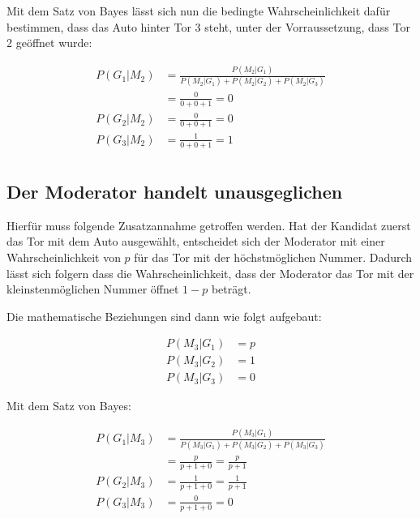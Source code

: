 Mit dem Satz von Bayes lässt sich nun die bedingte Wahrscheinlichkeit dafür bestimmen, dass das Auto hinter Tor 3 steht, unter der Vorraussetzung, dass Tor 2 geöffnet wurde:

\begin{equation}
    \begin{split}
        P(G_1 | M_2) & = \frac{P(M_2 | G_1)}{P(M_2 | G_1) +
            P(M_2 | G_2) + P(M_2 | G_3)} \\
        & = \frac{0}{0+0+1} = 0 \\
        P(G_2 | M_2) & =  \frac{0}{0+0+1} = 0 \\
        P(G_3 | M_2) & =  \frac{1}{0+0+1} = 1 \\
    \end{split}
\end{equation}


\subsection{Der Moderator handelt unausgeglichen}

Hierfür muss folgende Zusatzannahme getroffen werden. Hat der Kandidat zuerst das Tor mit dem Auto ausgewählt, entscheidet sich der Moderator mit einer Wahrscheinlichkeit von $p$
für das Tor mit der höchstmöglichen Nummer. Dadurch lässt sich folgern dass die Wahrscheinlichkeit, dass der Moderator das Tor mit der kleinstenmöglichen Nummer öffnet $1 - p$ beträgt.

Die mathematische Beziehungen sind dann wie folgt aufgebaut:

\begin{equation}
    \begin{split}
        P(M_3 | G_1) & = p \\
        P(M_3 | G_2) & = 1 \\
        P(M_3 | G_3) & = 0
    \end{split}
\end{equation}

Mit dem Satz von Bayes:

\begin{equation}
    \begin{split}
        P(G_1 | M_3) & = \frac{P(M_3 | G_1)}{P(M_3 | G_1) +
            P(M_3 | G_2) + P(M_3 | G_3)} \\
        & = \frac{p}{p+1+0} = \frac{p}{p+1} \\
        P(G_2 | M_3) & =  \frac{1}{p+1+0} = \frac{1}{p+1} \\
        P(G_3 | M_3) & =  \frac{0}{p+1+0} = 0 \\
    \end{split}
\end{equation}

